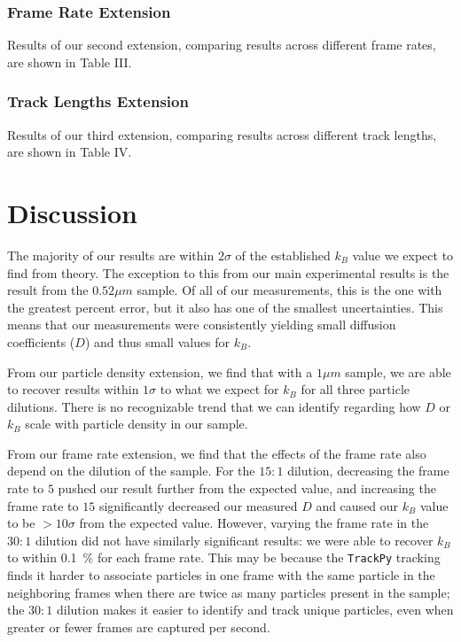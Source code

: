 \documentclass[twocolumn,amsmath,amssymb,pra, floatfix]{revtex4-2}
\begin{document}


\subsubsection{Frame Rate Extension}
Results of our second extension, comparing results across different frame rates, are shown in Table III. 



\subsubsection{Track Lengths Extension}
Results of our third extension, comparing results across different track lengths, are shown in Table IV. 





\section{Discussion}

The majority of our results are within $2\sigma$ of the established $k_B$ value we expect to find from theory. The exception to this from our main experimental results is the result from the $0.52 \si{\mu m}$ sample. Of all of our measurements, this is the one with the greatest percent error, but it also has one of the smallest uncertainties. This means that our measurements were consistently yielding small diffusion coefficients ($D$) and thus small values for $k_B$.

From our particle density extension, we find that with a $1 \si{\mu m}$ sample, we are able to recover results within $1\sigma$ to what we expect for $k_B$ for all three particle dilutions. There is no recognizable trend that we can identify regarding how $D$ or $k_B$ scale with particle density in our sample. 

From our frame rate extension, we find that the effects of the frame rate also depend on the dilution of the sample. For the $15:1$ dilution, decreasing the frame rate to $5$ pushed our result further from the expected value, and increasing the frame rate to $15$ significantly decreased our measured $D$ and caused our $k_B$ value to be $>10\sigma$ from the expected value. However, varying the frame rate in the $30:1$ dilution did not have similarly significant results: we were able to recover $k_B$ to within \SI{0.1}{\percent} for each frame rate. This may be because the \texttt{TrackPy} tracking finds it harder to associate particles in one frame with the same particle in the neighboring frames when there are twice as many particles present in the sample; the $30:1$ dilution makes it easier to identify and track unique particles, even when greater or fewer frames are captured per second. 
\end{document}
